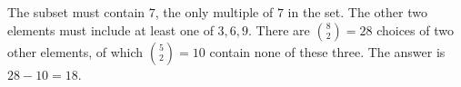 The subset must contain $7$, the only multiple of $7$ in the set. The other two elements must include at least one of $3,6,9$. There are $\binom82=28$ choices of two other elements, of which $\binom52=10$ contain none of these three. The answer is $28-10=\boxed{18}$.
